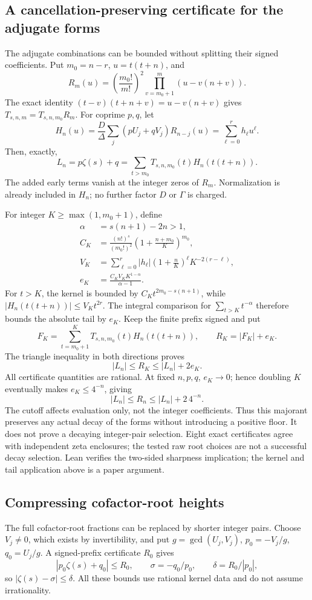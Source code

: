 \documentclass[11pt]{article}
\theoremstyle{remark}
\begin{document}
\subsection{A cancellation-preserving certificate for the adjugate forms}
The adjugate combinations can be bounded without splitting their signed
coefficients. Put \(m_0=n-r\), \(u=t(t+n)\), and
\[
 R_m(u)=\left(\frac{m_0!}{m!}\right)^2
         \prod_{v=m_0+1}^m(u-v(n+v)).
\]
The exact identity \((t-v)(t+n+v)=u-v(n+v)\) gives
\(T_{s,n,m}=T_{s,n,m_0}R_m\). For coprime \(p,q\), let
\[
 H_n(u)=\frac D\Delta\sum_j(pU_j+qV_j)R_{n-j}(u)
       =\sum_{\ell=0}^rh_\ell u^\ell.
\]
Then, exactly,
\[
 L_n=p\zeta(s)+q
   =\sum_{t>m_0}T_{s,n,m_0}(t)H_n(t(t+n)).
\]
The added early terms vanish at the integer zeros of \(R_m\).
Normalization is already included in \(H_n\); no further factor
\(D\) or \(\Gamma\) is charged.

For integer \(K\ge\max(1,m_0+1)\), define
\begin{align*}
 \alpha&=s(n+1)-2n>1,\\
 C_K&=\frac{(n!)^s}{(m_0!)^2}
             \left(1+\frac{n+m_0}K\right)^{m_0},\\
 V_K&=\sum_{\ell=0}^r|h_\ell|
             \left(1+\frac nK\right)^\ell K^{-2(r-\ell)},\\
 e_K&=\frac{C_KV_KK^{1-\alpha}}{\alpha-1}.
\end{align*}
For \(t>K\), the kernel is bounded by
\(C_Kt^{2m_0-s(n+1)}\), while
\(|H_n(t(t+n))|\le V_Kt^{2r}\). The integral comparison for
\(\sum_{t>K}t^{-\alpha}\) therefore bounds the absolute tail by
\(e_K\). Keep the finite prefix signed and put
\[
 F_K=\sum_{t=m_0+1}^KT_{s,n,m_0}(t)H_n(t(t+n)),\qquad
 R_K=|F_K|+e_K.
\]
The triangle inequality in both directions proves
\[
 |L_n|\le R_K\le |L_n|+2e_K.
\]
All certificate quantities are rational. At fixed \(n,p,q\),
\(e_K\to0\); hence doubling \(K\) eventually makes
\(e_K\le4^{-n}\), giving
\[
 |L_n|\le R_n\le |L_n|+2\,4^{-n}.
\]
The cutoff affects evaluation only, not the integer coefficients.
Thus this majorant preserves any actual decay of the forms without
introducing a positive floor. It does not prove a decaying integer-pair
selection. Eight exact certificates agree with independent zeta
enclosures; the tested raw root choices are not a successful decay
selection. Lean verifies the two-sided sharpness implication; the
kernel and tail application above is a paper argument.

\subsection{Compressing cofactor-root heights}
The full cofactor-root fractions can be replaced by shorter integer
pairs. Choose \(V_j\ne0\), which exists by invertibility, and put
\(g=\gcd(U_j,V_j)\), \(p_0=-V_j/g\), \(q_0=U_j/g\).
A signed-prefix certificate \(R_0\) gives
\[
 |p_0\zeta(s)+q_0|\le R_0,\qquad
 \sigma=-q_0/p_0,\qquad \delta=R_0/|p_0|,
\]
so \(|\zeta(s)-\sigma|\le\delta\). All these bounds use rational
kernel data and do not assume irrationality.
\end{document}
